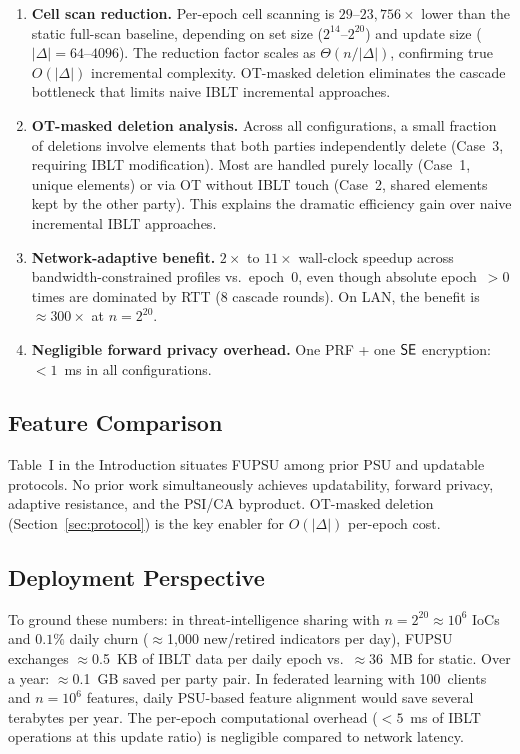 \begin{enumerate}
\item \textbf{Cell scan reduction.} Per-epoch cell scanning is
$29$--$23{,}756\times$ lower than the static full-scan baseline, depending on
set size ($2^{14}$--$2^{20}$) and update size ($|\Delta|=64$--$4096$). The
reduction factor scales as $\Theta(n/|\Delta|)$, confirming true $O(|\Delta|)$
incremental complexity. OT-masked deletion eliminates the cascade bottleneck
that limits naive IBLT incremental approaches.
\item \textbf{OT-masked deletion analysis.} Across all configurations,
a small fraction of deletions involve elements that both parties independently
delete (Case~3, requiring IBLT modification). Most are
handled purely locally (Case~1, unique elements) or via OT without IBLT
touch (Case~2, shared elements kept by the other party). This explains the
dramatic efficiency gain over naive incremental IBLT approaches.
\item \textbf{Network-adaptive benefit.} $2\times$ to $11\times$ wall-clock
speedup across bandwidth-constrained profiles vs.\ epoch~0, even though
absolute epoch~$>$0 times are dominated by RTT (8 cascade rounds). On LAN,
the benefit is $\approx 300\times$ at $n=2^{20}$.
\item \textbf{Negligible forward privacy overhead.} One PRF + one $\mathsf{SE}$ encryption:
$<1$~ms in all configurations.
\end{enumerate}

\subsection{Feature Comparison}

Table~I in the Introduction situates FUPSU among prior PSU and updatable
protocols. No prior work simultaneously achieves updatability, forward
privacy, adaptive resistance, and the PSI/CA byproduct. OT-masked deletion
(Section~\ref{sec:protocol}) is the key enabler for $O(|\Delta|)$ per-epoch
cost.

\subsection{Deployment Perspective}

To ground these numbers: in threat-intelligence sharing with $n = 2^{20}
\approx 10^6$ IoCs and $0.1\%$ daily churn ($\approx$1,000 new/retired
indicators per day), FUPSU exchanges $\approx$0.5~KB of IBLT data per daily
epoch vs.\ $\approx$36~MB for static. Over a year: $\approx$0.1~GB saved per
party pair. In federated learning with 100~clients and $n = 10^6$ features,
daily PSU-based feature alignment would save several terabytes per year. The
per-epoch computational overhead ($<5$~ms of IBLT operations at this update
ratio) is negligible compared to network latency.

